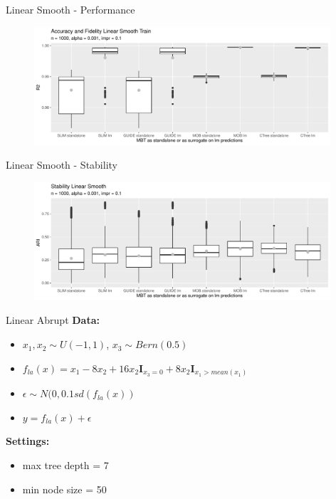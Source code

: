 \documentclass[9pt, xcolor=table]{beamer}
\begin{document}
\begin{frame}{Linear Smooth - Performance}
\begin{figure}
    \includegraphics[width=11cm]{Figures/simulations/batchtools/basic_scenarios/linear_smooth/ls_1000_standalone_lm_r2_train.pdf}
\end{figure}  
\end{frame}


\begin{frame}{Linear Smooth - Stability}

\begin{figure}
    \includegraphics[width=11cm]{Figures/simulations/batchtools/basic_scenarios/linear_smooth/ls_1000_standalone_lm_sta.pdf}
\end{figure}  
\end{frame}

\begin{frame}{Linear Abrupt}
\textbf{Data:}
\begin{itemize}
    \item $x_1, x_2 \sim U(-1,1)$, $x_3 \sim Bern(0.5)$
    \item $ f_{la}(x) = x_{1} - 8  x_2 + 16  x_2  \mathbf{I}_{x_3 = 0} + 8  x_2  \mathbf{I}_{x_1 > mean(x_1)}$
    \item $\epsilon \sim N(0, 0.1 sd(f_{la}(x))$
    \item $y = f_{la}(x) + \epsilon$
\end{itemize} 

\textbf{Settings:}
\begin{itemize}
    \item max tree depth = 7 
    \item min node size = 50    
\end{itemize}
\end{frame}
\end{document}

